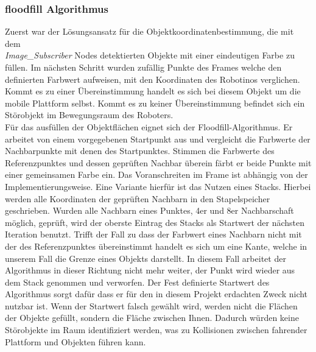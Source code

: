	\subsubsection{floodfill Algorithmus}
	Zuerst war der Lösungsansatz für die Objektkoordinatenbestimmung, die mit dem\\ \textit{Image\_Subscriber} Nodes detektierten Objekte mit einer eindeutigen Farbe zu füllen. Im nächsten Schritt wurden zufällig Punkte des Frames welche den definierten Farbwert aufweisen, mit den Koordinaten des Robotinos verglichen. Kommt es zu einer Übereinstimmung handelt es sich bei diesem Objekt um die mobile Plattform selbst. Kommt es zu keiner Übereinstimmung befindet sich ein Störobjekt im Bewegungsraum des Roboters.\\ Für das ausfüllen der Objektflächen eignet sich der Floodfill-Algorithmus. Er arbeitet von einem vorgegebenen Startpunkt aus und vergleicht die Farbwerte der Nachbarpunkte mit denen des Startpunktes. Stimmen die Farbwerte des Referenzpunktes und dessen geprüften Nachbar überein färbt er beide Punkte mit einer gemeinsamen Farbe ein. Das Voranschreiten im Frame ist abhängig von der Implementierungsweise. Eine Variante hierfür ist das Nutzen eines Stacks. Hierbei werden alle Koordinaten der geprüften Nachbarn in den Stapelspeicher geschrieben. Wurden alle Nachbarn eines Punktes, 4er und 8er Nachbarschaft möglich, geprüft, wird der oberste Eintrag des Stacks als Startwert der nächsten Iteration benutzt. Trifft der Fall zu dass der Farbwert eines Nachbarn nicht mit der des Referenzpunktes übereinstimmt handelt es sich um eine Kante, welche in unserem Fall die Grenze eines Objekts darstellt. In diesem Fall arbeitet der Algorithmus in dieser Richtung nicht mehr weiter, der Punkt wird wieder aus dem Stack genommen und verworfen. Der Fest definierte Startwert des Algorithmus sorgt dafür dass er für den in diesem Projekt erdachten Zweck nicht nutzbar ist. Wenn der Startwert falsch gewählt wird, werden nicht die Flächen der Objekte gefüllt, sondern die Fläche zwischen Ihnen. Dadurch würden keine Störobjekte im Raum identifiziert werden, was zu Kollisionen zwischen fahrender Plattform und Objekten führen kann.\newline \cite{lode-floodfill}
	
